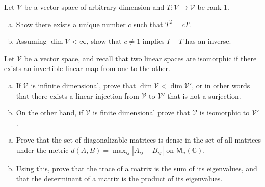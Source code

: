 \documentclass[12pt,letterpaper,cm]{hmcpset}
\begin{document}
\begin{problem}[1 (Lax 3.14)]
    Let $\mathcal{V}$ be a vector space of arbitrary dimension and $T : \mathcal{V}\to\mathcal{V}$
    be rank $1$.
\begin{enumerate}[(a)]
    \item Show there exists a unique number $c$ such that $T^2 = cT$.
    \item Assuming $\dim\mathcal{V}<\infty$, show that $c\neq 1$ implies $I-T$ has an inverse.
\end{enumerate}
\end{problem}

\begin{solution}
    \vfill
\end{solution}
\clearpage

\begin{problem}[2]
    Let $\mathcal{V}$ be a vector space, and recall that two linear spaces are
    isomorphic if there exists an invertible linear map from one to the other.
\begin{enumerate}[(a)]
    \item If $\mathcal{V}$ is infinite dimensional, prove that $\dim\mathcal{V} < \dim\mathcal{V}'$,
        or in other words that there exists a linear injection from $\mathcal{V}$ to $\mathcal{V}'$ that is not a surjection.
    \item On the other hand, if $\mathcal{V}$ is finite dimensional prove that
        $\mathcal{V}$ is isomorphic to $\mathcal{V}'$.
\end{enumerate}
\end{problem}

\begin{solution}
    \vfill
\end{solution}
\clearpage

\begin{problem}[3]
\begin{enumerate}[(a)]
    \item Prove that the set of diagonalizable matrices is dense in the set of all matrices
        under the metric $d(A,B) = \max_{ij}|A_{ij} - B_{ij}|$ on $\mathsf{M}_n(\mathbb{C})$.
    \item Using this, prove that the trace of a matrix is the sum of its eigenvalues, and that the determinant
        of a matrix is the product of its eigenvalues.
\end{enumerate}
\end{problem}

\begin{solution}
    \vfill
\end{solution}
\clearpage
\end{document}
